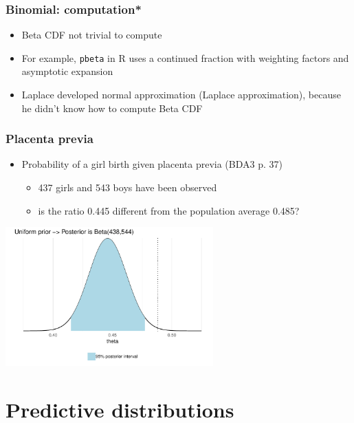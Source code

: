 \documentclass[10pt]{beamer}
\begin{document}
\begin{frame}
  \frametitle{Binomial: computation*}

  \begin{itemize}
  \item Beta CDF not trivial to compute
  \item For example, {\tt pbeta} in R uses a continued fraction with
    weighting factors and asymptotic expansion
  \item Laplace developed normal approximation (Laplace
    approximation), because he didn't know how to compute Beta CDF
  \end{itemize}

\end{frame}

\begin{frame}
  \frametitle{Placenta previa}

  \begin{itemize}
  \item Probability of a girl birth given placenta previa (BDA3 p. 37)
    \begin{itemize}
    \item 437 girls and 543 boys have been observed
    \item is the ratio 0.445 different from the population average 0.485?
    \end{itemize}
  \end{itemize}
  \pause
  \includegraphics[width=8cm]{figs/demo2_1.pdf}
\end{frame}

\section{Predictive distributions}
\end{document}
